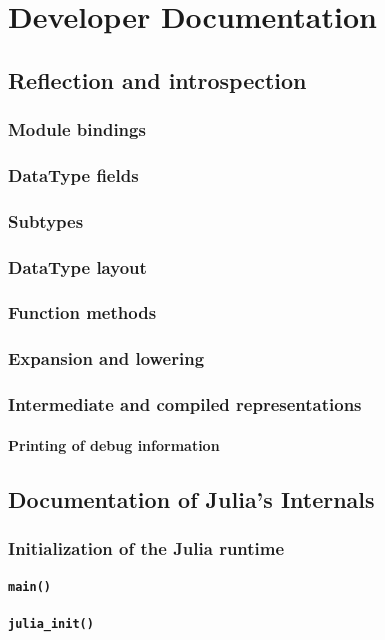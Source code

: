 \part{Developer Documentation}
  \chapter{Reflection and introspection}
    \section{Module bindings}
    \section{DataType fields}
    \section{Subtypes}
    \section{DataType layout}
    \section{Function methods}
    \section{Expansion and lowering}
    \section{Intermediate and compiled representations}
    \subsection{Printing of debug information}
  \chapter{Documentation of Julia's Internals}
    \section{Initialization of the Julia runtime}
    \subsection{\texttt{main()}}
    \subsection{\texttt{julia\_init()}}
